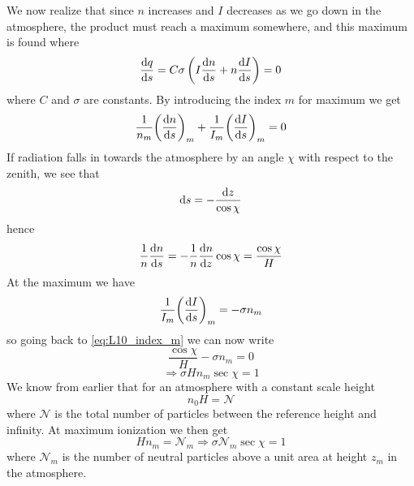 We now realize that since \(n\) increases and \(I\) decreases as we go down in the atmosphere, the product must reach a maximum somewhere, and this maximum is found where
\begin{equation*}
    \fracd[s]{q}=C\sigma\left(I\fracd[s]{n}+n\fracd[s]{I}\right)=0
\end{equation*}
where \(C\) and \(\sigma \) are constants. By introducing the index \(m\) for maximum we get
\begin{equation}\label{eq:L10_index_m}
    \frac{1}{n_m}{\left(\fracd[s]{n}\right)}_m+\frac{1}{I_m}{\left(\fracd[s]{I}\right)}_m=0
\end{equation}
If radiation falls in towards the atmosphere by an angle \(\chi \) with respect to the zenith, we see that
\begin{equation}\label{eq:L10_ds_rewritten}
    \tn{d}s=-\frac{\tn{d}z}{\cos\chi}
\end{equation}
hence
\begin{equation*}
    \frac{1}{n}\fracd[s]{n}=-\frac{1}{n}\fracd[z]{n}\cos\chi=\frac{\cos\chi}{H}
\end{equation*}
At the maximum we have
\begin{equation*}
    \frac{1}{I_m}{\left(\fracd[s]{I}\right)}_m=-\sigma n_m
\end{equation*}
so going back to \cref{eq:L10_index_m} we can now write
\begin{equation*}
    \frac{\cos\chi}{H}-\sigma n_m=0
\end{equation*}
\begin{equation*}
    \Rightarrow\sigma Hn_m\sec\chi=1
\end{equation*}
We know from earlier that for an atmosphere with a constant scale height
\begin{equation*}
    n_0H=\mathcal{N}
\end{equation*}
where \(\mathcal{N}\) is the total number of particles between the reference height and infinity. At maximum ionization we then get
\begin{equation*}
    Hn_m=\mathcal{N}_m\Rightarrow \sigma \mathcal{N}_m\sec\chi=1
\end{equation*}
where \(\mathcal{N}_m\) is the number of neutral particles above a unit area at height \(z_m\) in the
atmosphere.

